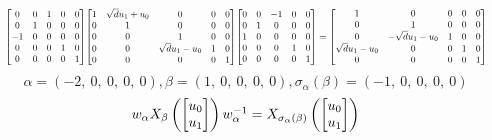 \documentclass[11pt]{article}
\theoremstyle{definition}
\begin{document}
\[
\scaletoalign{\textwidth}{{\left[\begin{matrix}0 & 0 & 1 & 0 & 0\\0 & 1 & 0 & 0 & 0\\-1 & 0 & 0 & 0 & 0\\0 & 0 & 0 & 1 & 0\\0 & 0 & 0 & 0 & 1\end{matrix}\right]} {\left[\begin{matrix}1 & \sqrt{d} u_{1} + u_{0} & 0 & 0 & 0\\0 & 1 & 0 & 0 & 0\\0 & 0 & 1 & 0 & 0\\0 & 0 & \sqrt{d} u_{1} - u_{0} & 1 & 0\\0 & 0 & 0 & 0 & 1\end{matrix}\right]} {\left[\begin{matrix}0 & 0 & -1 & 0 & 0\\0 & 1 & 0 & 0 & 0\\1 & 0 & 0 & 0 & 0\\0 & 0 & 0 & 1 & 0\\0 & 0 & 0 & 0 & 1\end{matrix}\right]} = {\left[\begin{matrix}1 & 0 & 0 & 0 & 0\\0 & 1 & 0 & 0 & 0\\0 & - \sqrt{d} u_{1} - u_{0} & 1 & 0 & 0\\\sqrt{d} u_{1} - u_{0} & 0 & 0 & 1 & 0\\0 & 0 & 0 & 0 & 1\end{matrix}\right]}}
\]
\[
\alpha = \left( -2, \  0, \  0, \  0, \  0\right), \beta = \left( 1, \  0, \  0, \  0, \  0\right), \sigma_{\alpha}(\beta) = \left( -1, \  0, \  0, \  0, \  0\right)
\]
\[
\scaletoalign{\textwidth}{w_{\alpha} X_{\beta}\left(\left[\begin{matrix}u_{0}\\u_{1}\end{matrix}\right]\right) w_{\alpha}^{-1} = X_{\sigma_{\alpha}\left(\beta\right)}\left(\left[\begin{matrix}u_{0}\\u_{1}\end{matrix}\right]\right)}
\]
\end{document}
